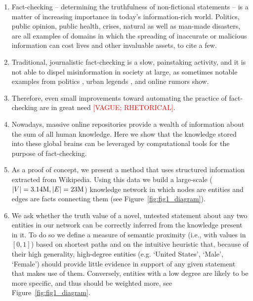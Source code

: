 \documentclass[10pt, letterpaper, english]{nature}
\begin{document}
\begin{enumerate}

    \item Fact-checking -- determining the truthfulness of non-fictional
        statements -- is a matter of increasing importance in today's
        information-rich world. Politics, public opinion, public health, crises,
        natural as well as man-made disasters, are all examples of domains in
        which the spreading of inaccurate or malicious information can cost
        lives and other invaluable assets, to cite a few.

    \item Traditional, journalistic fact-checking is a slow, painstaking
        activity, and it is not able to dispel misinformation in society at
        large, as sometimes notable examples from politics
        \cite{VariousAuthors2010,Ratkiewicz2011}, urban legends
        \cite{Snopes.com}, and online rumors \cite{Friggeri2014} show.

    \item Therefore, even small improvements toward automating the practice of
        fact-checking are in great need \textcolor{red}{[VAGUE; RHETORICAL]}.

    \item Nowadays, massive online repositories provide a wealth of information
        about the sum of all human knowledge. Here we show that the knowledge
        stored into these global brains can be leveraged by computational tools
        for the purpose of fact-checking. 
        
    \item As a proof of concept, we present a method that uses structured
        information extracted from Wikipedia. Using this data we build a
        large-scale ($|V| = 3.14{\rm M}, |E| = 23{\rm M}$) knowledge network in
        which nodes are entities and edges are facts connecting them (see
        Figure~\ref{fig:fig1_diagram}).

    \item We ask whether the truth value of a novel, untested statement about
        any two entities in our network can be correctly inferred from the
        knowledge present in it. To do so we define a measure of semantic
        proximity (i.e., with values in $\left[ 0, 1 \right]$) based on shortest
        paths and on the intuitive heuristic that, because of their high
        generality, high-degree entities (e.g. `United States', `Male',
        `Female') should provide little evidence in support of any given
        statement that makes use of them. Conversely, entities with a low degree
        are likely to be more specific, and thus should be weighted more, see
        Figure~\ref{fig:fig1_diagram}. 
        

\end{enumerate}
\end{document}
